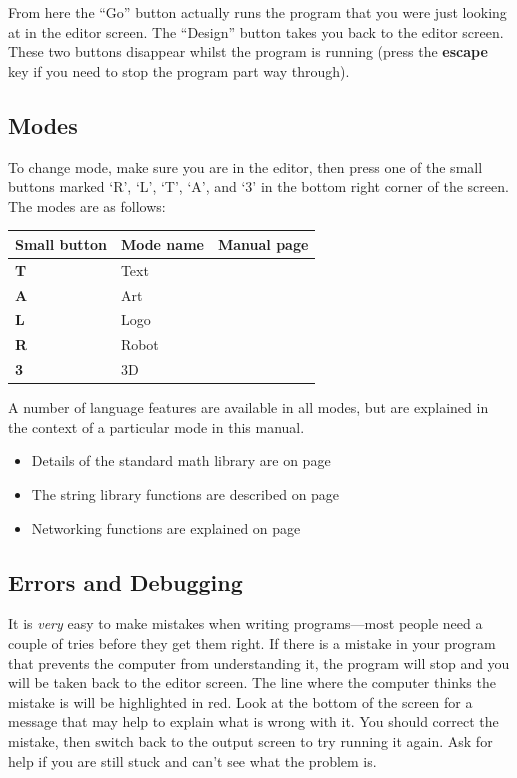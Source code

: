 \documentclass[12pt,a4paper,twoside]{article}
\renewcommand{\_}{\texttt{\symbol{95}}}
\begin{document}
From here the ``Go'' button actually runs the program that you were
just looking at in the editor screen.
The ``Design'' button takes you back to the editor screen.
These two buttons disappear whilst
the program is running (press the \textbf{escape} key if you need to stop
the program part way through).

\subsection{Modes}

To change mode, make sure you are in the editor, then press one of the
small buttons marked `R', `L', `T', `A', and `3' in the bottom right
corner of the screen. The modes are as follows:

\begin{tabular}{|l|l|l|}
\hline
Small button & Mode name & Manual page \\
\hline
\textbf{T} & Text & \pageref{sec:text-mode} \\ 
\textbf{A} & Art & \pageref{sec:art-mode}\\ 
\textbf{L} & Logo & \pageref{sec:logo-mode}\\
\textbf{R} & Robot & \pageref{sec:robot-mode}\\
\textbf{3} & 3D & \pageref{sec:3d-mode}\\
\hline
\end{tabular}

A number of language features are available in all modes, but are
explained in the context of a particular mode in this manual.
\begin{itemize}
\item Details of the standard math library are on page \pageref{sec:stand-math-libr}
\item The string library functions are described on page \pageref{sec:string-libr-funct} 
\item Networking functions are explained on page \pageref{sec:networking-functions}
\end{itemize}

\subsection{Errors and Debugging}

It is \emph{very} easy to make mistakes when writing programs---most
people need a couple of tries before they get them right.
If there is a mistake in your program that prevents the computer
from understanding it, the program will stop and you will be
taken back to the editor screen. The line where the computer thinks
the mistake is will be highlighted in red. Look at the bottom of
the screen for a message that may help to explain what is wrong
with it. You should correct the mistake, then switch back to the
output screen to try running it again. Ask for help if you are still
stuck and can't see what the problem is.
\end{document}
